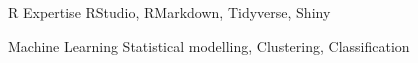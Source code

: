 

\begin{cvskills}
  \cvskill
    {R Expertise} %
    {RStudio, RMarkdown, Tidyverse, Shiny} %

  \cvskill
    {Machine Learning} %
    {Statistical modelling, Clustering, Classification} %



\end{cvskills}
